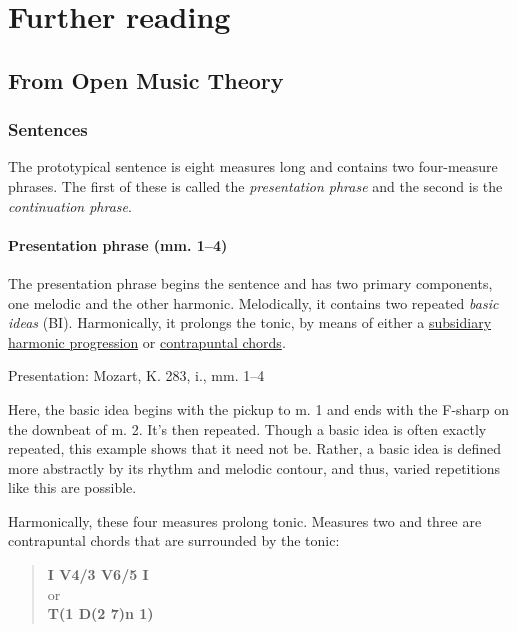 \documentclass{book}
\begin{document}
\hypertarget{further-reading-13}{%
\chapter{Further reading}\label{further-reading-13}}

\hypertarget{from-open-music-theory-13}{%
\section{From Open Music Theory}\label{from-open-music-theory-13}}

\hypertarget{sentences}{%
\subsection{Sentences}\label{sentences}}

The prototypical sentence is eight measures long and contains two four-measure
phrases. The first of these is called the \emph{presentation phrase} and the
second is the \emph{continuation phrase}.

\hypertarget{presentation-phrase-mm.-14}{%
\subsubsection{Presentation phrase (mm.
1--4)}\label{presentation-phrase-mm.-14}}

The presentation phrase begins the sentence and has two primary components,
one melodic and the other harmonic. Melodically, it contains two repeated
\emph{basic ideas} (BI). Harmonically, it prolongs the tonic, by means of
either a
\href{harmonicSyntax2.html\#subsidiary-harmonic-progressions\%22}{subsidiary
harmonic progression} or
\href{harmonicSyntax2.html\#contrapuntal-prolongation--passing-chord}{contrapuntal
chords}.

Presentation: Mozart, K. 283, i., mm. 1--4

Here, the basic idea begins with the pickup to m. 1 and ends with the F-sharp
on the downbeat of m. 2. It's then repeated. Though a basic idea is often
exactly repeated, this example shows that it need not be. Rather, a basic idea
is defined more abstractly by its rhythm and melodic contour, and thus, varied
repetitions like this are possible.

Harmonically, these four measures prolong tonic. Measures two and three are
contrapuntal chords that are surrounded by the tonic:

\begin{quote}
\textbf{I V4/3 V6/5 I}\\
or\\
\textbf{T(1 D(2 7)n 1)}
\end{quote}
\end{document}
